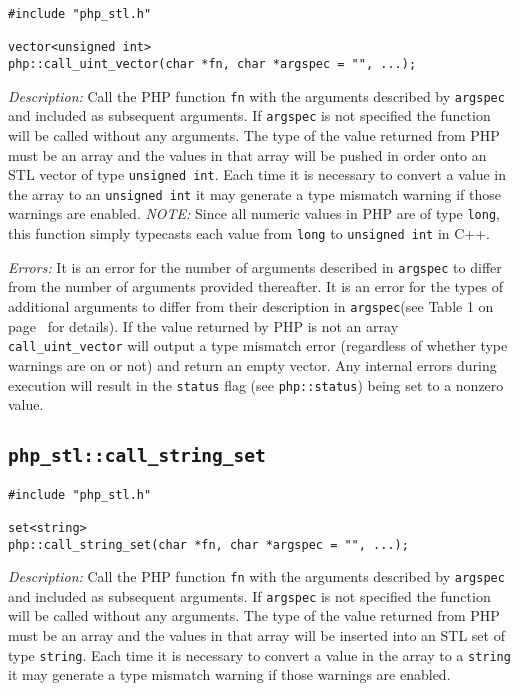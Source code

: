 \documentclass[11pt,titlepage]{article}
\begin{document}
\begin{verbatim}
#include "php_stl.h"

vector<unsigned int> 
php::call_uint_vector(char *fn, char *argspec = "", ...);
\end{verbatim}

\emph{Description:} Call the PHP function \verb|fn| with the arguments described by \verb|argspec| and included as subsequent arguments. If \verb|argspec| is not specified the function will be called without any arguments. The type of the value returned from PHP must be an array and the values in that array will be pushed in order onto an STL vector of type \verb|unsigned int|. Each time it is necessary to convert a value in the array to an \verb|unsigned int| it may generate a type mismatch warning if those warnings are enabled. \emph{NOTE:} Since all numeric values in PHP are of type \verb|long|, this function simply typecasts each value from \verb|long| to \verb|unsigned int| in C++.

\emph{Errors:} It is an error for the number of arguments described in \verb|argspec| to differ from the number of arguments provided thereafter. It is an error for the types of additional arguments to differ from their description in \verb|argspec|(see Table 1 on page~\pageref{Table1} for details). If the value returned by PHP is not an array \verb|call_uint_vector| will output a type mismatch error (regardless of whether type warnings are on or not) and return an empty vector. Any internal errors during execution will result in the \verb|status| flag (see \verb|php::status|) being set to a nonzero value.


\subsection{\texttt{php\_stl::call\_string\_set}}

\begin{verbatim}
#include "php_stl.h"

set<string> 
php::call_string_set(char *fn, char *argspec = "", ...);
\end{verbatim}

\emph{Description:} Call the PHP function \verb|fn| with the arguments described by \verb|argspec| and included as subsequent arguments. If \verb|argspec| is not specified the function will be called without any arguments. The type of the value returned from PHP must be an array and the values in that array will be inserted into an STL set of type \verb|string|. Each time it is necessary to convert a value in the array to a \verb|string| it may generate a type mismatch warning if those warnings are enabled.
\end{document}
